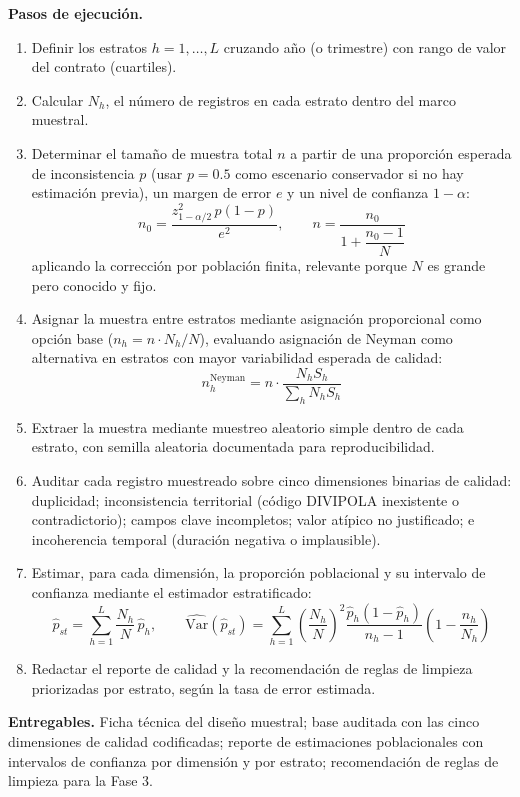 \documentclass[11pt,letterpaper]{article}
\begin{document}
\textbf{Pasos de ejecución.}
\begin{enumerate}
\item Definir los estratos $h = 1, \dots, L$ cruzando año (o trimestre) con
rango de valor del contrato (cuartiles).
\item Calcular $N_h$, el número de registros en cada estrato dentro del marco
muestral.
\item Determinar el tamaño de muestra total $n$ a partir de una proporción
esperada de inconsistencia $p$ (usar $p=0.5$ como escenario conservador si no
hay estimación previa), un margen de error $e$ y un nivel de confianza
$1-\alpha$:
\[
n_0 = \frac{z_{1-\alpha/2}^2\, p(1-p)}{e^2}, \qquad
n = \frac{n_0}{1 + \dfrac{n_0 - 1}{N}}
\]
aplicando la corrección por población finita, relevante porque $N$ es grande
pero conocido y fijo.
\item Asignar la muestra entre estratos mediante asignación proporcional
como opción base ($n_h = n\cdot N_h/N$), evaluando asignación de Neyman como
alternativa en estratos con mayor variabilidad esperada de calidad:
\[
n_h^{\text{Neyman}} = n \cdot \frac{N_h S_h}{\sum_h N_h S_h}
\]
\item Extraer la muestra mediante muestreo aleatorio simple dentro de cada
estrato, con semilla aleatoria documentada para reproducibilidad.
\item Auditar cada registro muestreado sobre cinco dimensiones binarias de
calidad: duplicidad; inconsistencia territorial (código DIVIPOLA inexistente o
contradictorio); campos clave incompletos; valor atípico no justificado; e
incoherencia temporal (duración negativa o implausible).
\item Estimar, para cada dimensión, la proporción poblacional y su intervalo de
confianza mediante el estimador estratificado:
\[
\hat p_{st} = \sum_{h=1}^{L} \frac{N_h}{N}\,\hat p_h, \qquad
\widehat{\text{Var}}(\hat p_{st}) = \sum_{h=1}^{L}
\left(\frac{N_h}{N}\right)^2 \frac{\hat p_h (1-\hat p_h)}{n_h - 1}
\left(1-\frac{n_h}{N_h}\right)
\]
\item Redactar el reporte de calidad y la recomendación de reglas de limpieza
priorizadas por estrato, según la tasa de error estimada.
\end{enumerate}

\textbf{Entregables.} Ficha técnica del diseño muestral; base auditada con las
cinco dimensiones de calidad codificadas; reporte de estimaciones poblacionales
con intervalos de confianza por dimensión y por estrato; recomendación de
reglas de limpieza para la Fase 3.
\end{document}
